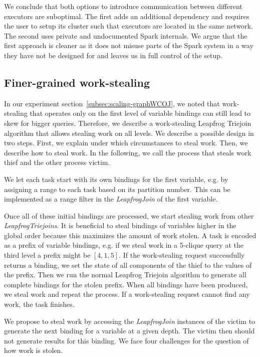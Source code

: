 We conclude that both options to introduce communication between different executors are suboptimal.
The first adds an additional dependency and requires the user to setup its cluster such that executors are located in the same
network.
The second uses private and undocumented Spark internals.
We argue that the first approach is cleaner as it does not misuse parts of the Spark system in a way they have not be designed for
and leaves us in full control of the setup.

\subsection{Finer-grained work-stealing} \label{subsubsec:finer-grained-work-stealing}
In our experiment section~\ref{subsec:scaling-graphWCOJ}, we noted that work-stealing that
operates only on the first level of variable bindings can still lead to skew for bigger queries.
Therefore, we describe a work-stealing Leapfrog Triejoin algorithm that allows stealing work
on all levels.
We describe a possible design in two steps.
First, we explain under which circumstances to steal work.
Then, we describe how to steal work.
In the following, we call the process that steals work thief and the other process
victim.

We let each task start with its own bindings for the first variable, e.g. by assigning
a range to each task based on its partition number.
This can be implemented as a range filter in the \textit{LeapfrogJoin} of the first variable.

Once all of these initial bindings are processed, we start stealing work from other
\textit{LeapfrogTriejoins}.
It is beneficial to steal bindings of variables higher in the global order because this
maximizes the amount of work stolen.
A task is encoded as a prefix of variable bindings, e.g. if we steal work in a 5-clique query at
the third level a prefix might be $[4, 1 , 5]$.
If the work-stealing request successfully returns a binding, we set the state of all components
of the thief to the values of the prefix.
Then we run the normal Leapfrog Triejoin algorithm to generate all complete bindings for the stolen
prefix.
When all bindings have been produced, we steal work and repeat the process.
If a work-stealing request cannot find any work, the task finishes.

We propose to steal work by accessing the \textit{LeapfrogJoin} instances of the victim to generate
the next binding for a variable at a given depth.
The victim then should not generate results for this binding.
We face four challenges for the question of how work is stolen.

